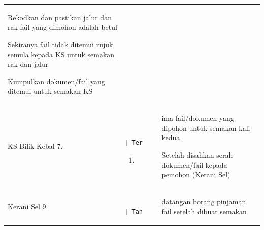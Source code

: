 \documentclass[
]{article}
\begin{document}
\begin{longtable}[]{@{}lll@{}}
\begin{minipage}[t]{0.30\columnwidth}
Rekodkan dan pastikan jalur dan rak fail yang dimohon adalah betul

Sekiranya fail tidak ditemui rujuk semula kepada KS untuk semakan rak
dan jalur

Kumpulkan dokumen/fail yang ditemui untuk semakan KS\strut
\end{minipage}\tabularnewline
\begin{minipage}[t]{0.30\columnwidth}\raggedright
KS Bilik Kebal \textbar{} 7.\strut
\end{minipage} & \begin{minipage}[t]{0.30\columnwidth}\raggedright
\begin{verbatim}
              | Ter
\end{verbatim}

\begin{enumerate}
\def\labelenumi{\arabic{enumi}.}
\setcounter{enumi}{7}
\item
\end{enumerate}\strut
\end{minipage} & \begin{minipage}[t]{0.30\columnwidth}\raggedright
ima fail/dokumen yang dipohon untuk semakan kali kedua

Setelah disahkan serah dokumen/fail kepada pemohon (Kerani Sel)\strut
\end{minipage}\tabularnewline
\begin{minipage}[t]{0.30\columnwidth}\raggedright
Kerani Sel \textbar{} 9.\strut
\end{minipage} & \begin{minipage}[t]{0.30\columnwidth}\raggedright
\begin{verbatim}
              | Tan
\end{verbatim}
\strut
\end{minipage} & \begin{minipage}[t]{0.30\columnwidth}\raggedright
datangan borang pinjaman fail setelah dibuat semakan\strut
\end{minipage}\tabularnewline
\bottomrule
\end{longtable}
\end{document}
